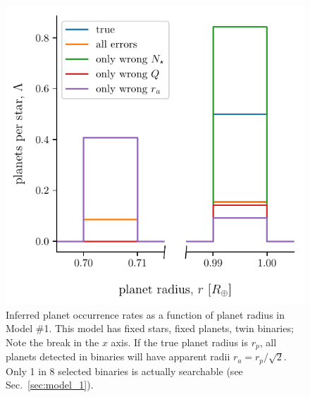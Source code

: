 \begin{figure}
    \begin{center}
        \includegraphics[width=\textwidth]{figures/errcases_rate_density_vs_radius_model_1_brokenx.pdf}
    \end{center}
    \caption{
    Inferred planet occurrence rates as a function of planet radius in Model 
    \#1.
    This model has fixed stars, fixed planets, twin binaries;
    Note the break in the $x$ axis.
    If the true planet radius is $r_p$, all planets 
    detected in binaries will have apparent radii $r_a = r_p/\sqrt{2}$.
    Only 1 in 8 selected binaries is actually searchable (see 
    Sec.~\ref{sec:model_1}).
    }
    \label{fig:errcases_model_1}
\end{figure}

